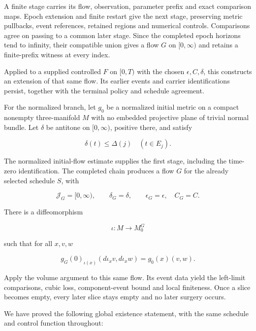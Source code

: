 A finite stage carries its flow, observation, parameter prefix and exact
comparison maps. Epoch extension and finite restart give the next stage,
preserving metric pullbacks, event references, retained regions and numerical
controls. Comparisons agree on passing to a common later stage. Since the
completed epoch horizons tend to infinity, their compatible union gives a
flow $G$ on $[0,\infty)$ and retains a finite-prefix witness at every index.

Applied to a supplied controlled $F$ on $[0,T)$ with the chosen
$\epsilon,C,\delta$, this constructs an extension of that same flow.
Its earlier events and carrier identifications persist, together with
the terminal policy and schedule agreement.

For the normalized branch, let $g_0$ be a normalized initial metric on a compact
nonempty three-manifold $M$ with no embedded projective plane of trivial normal
bundle.  Let $\delta$ be antitone on $[0,\infty)$, positive there, and satisfy

\begin{equation}
 \delta(t)\leq\Delta(j)\quad(t\in E_j).
 \label{eq:global-control-cutoff}
\end{equation}

The normalized initial-flow estimate supplies the first stage, including
the time-zero identification. The
completed chain produces a flow $G$ for the already selected schedule $S$, with

\[
 \mathcal J_G=[0,\infty),\qquad
 \delta_G=\delta,\qquad \epsilon_G=\epsilon,
 \quad C_G=C.
\]

There is a diffeomorphism

\[
 \iota:M\longrightarrow M_0^G
\]

such that for all $x,v,w$

\begin{equation}
 g_G(0)_{\iota(x)}(d\iota_xv,d\iota_xw)=g_0(x)(v,w).
 \label{eq:global-initial-identification}
\end{equation}

Apply the volume argument to this same flow. Its event data yield the
left-limit comparisons, cubic loss, component-event bound and local
finiteness. Once a slice becomes empty, every later slice stays empty and
no later surgery occurs.

We have proved the following global existence statement, with the same
schedule and control function throughout:

